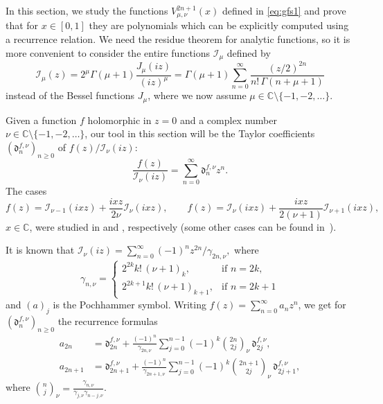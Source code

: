 \documentclass[10pt,a4paper]{article}
\numberwithin{equation}{section}
\theoremstyle{plain}
\theoremstyle{definition}
\newcommand{\I}{\mathcal{I}}
\newcommand{\dd}{\mathfrak{d}}
\newcommand{\cc}{\gamma}
\newcommand{\CC}{\mathbb{C}}
\begin{document}
In this section, we study the functions $V_{\mu,\nu}^{2n+1}(x)$ defined in \eqref{eq:gfs1} and prove that for $x\in [0,1]$ they are polynomials which can be explicitly computed using a recurrence relation. We need the residue theorem for analytic functions, so it is more convenient to consider the entire functions $\I_\mu$ defined by
\begin{equation}
\label{eq:ial}
  \I_\mu(z) = 2^\mu \Gamma(\mu+1) \frac{J_\mu(iz)}{(iz)^\mu}
  = \Gamma(\mu+1) \sum_{n=0}^\infty \frac{(z/2)^{2n}}{n!\,\Gamma(n+\mu+1)}
\end{equation}
instead of the Bessel functions $J_\mu$, where we now assume $\mu\in \CC\setminus\{-1,-2,\dots \}$.

Given a function $f$ holomorphic in $z=0$ and a complex number $\nu\in \CC\setminus \{-1,-2,\dots\}$, our tool in this section will be the Taylor coefficients $(\dd_n^{f,\nu})_{n\ge 0}$ of $f(z)/\I_{\nu}(iz)$:
\begin{equation}
\label{eq:diarrea}
   \frac{f(z)}{\I_{\nu}(iz)} = \sum_{n=0}^\infty \dd^{f,\nu}_{n} z^n.
\end{equation}
The cases
\[
   f(z) = \I_{\nu-1} (ixz) + \frac{ixz}{2\nu }\I_{\nu} (ixz),
   \qquad
   f(z) = \I_\nu (ixz) + \frac{ixz}{2(\nu +1)}\I_{\nu +1} (ixz),
\]
$x\in \CC$, were studied in \cite{CDPV} and \cite{DPV}, respectively
(some other cases can be found in~\cite{CMV}).

It is known that
$
  \I_{\nu}(iz) = \sum_{n=0}^\infty {(-1)^nz^{2n}}/{\cc_{2n,\nu}},
$
where
\begin{equation}
\label{eq:garr}
   \cc_{n,\nu} = \begin{cases}
   2^{2k}k!\,(\nu+1)_k, & \text{if } n=2k,
   \\
   2^{2k+1}k!\,(\nu+1)_{k+1}, & \text{if }n=2k+1
   \end{cases}
\end{equation}
and $(a)_j$ is the Pochhammer symbol.
Writing $f(z) = \sum_{n=0}^\infty a_nz^n$,
we get for $(\dd_n^{f,\nu})_{n\ge 0}$ the recurrence formulas
\begin{equation}
\label{eq:recus}
\begin{aligned}
   a_{2n}
   &= \dd^{f,\nu}_{2n}+\frac{(-1)^n}{\cc_{2n,\nu}}
   \sum_{j=0}^{n-1} (-1)^k\binom{2n}{2j}_{\!\nu} \, \dd^{f,\nu}_{2j},
\\
   a_{2n+1}
   &= \dd^{f,\nu}_{2n+1}+\frac{(-1)^n}{\cc_{2n+1,\nu}}
   \sum_{j=0}^{n-1} (-1)^k\binom{2n+1}{2j}_{\!\nu} \, \dd^{f,\nu}_{2j+1},
\end{aligned}
\end{equation}
where $\binom{n}{j}_{\!\nu} = \frac{\cc_{n,\nu}}{\cc_{j,\nu}\cc_{n-j,\nu}}$.
\end{document}
